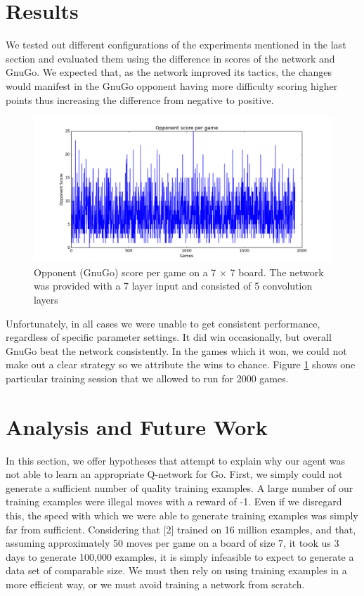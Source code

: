 \section{Results}

We tested out different configurations of the experiments mentioned in the last section and evaluated them using the difference in scores of the network and GnuGo. We expected that, as the network improved its tactics, the changes would manifest in the GnuGo opponent having more difficulty scoring higher points thus increasing the difference from negative to positive.

\begin{figure}[h!]
\centering
\includegraphics[scale=0.5]{training_score.png}
\caption{Opponent (GnuGo) score per game on a 7 $\times$ 7 board. The network was provided with a 7 layer input and consisted of 5 convolution layers}
\label{fig:score}
\end{figure}


Unfortunately, in all cases we were unable to get consistent performance, regardless of specific parameter settings. It did win occasionally, but overall GnuGo beat the network consistently. In the games which it won, we could not make out a clear strategy so we attribute the wins to chance. Figure \ref{fig:score} shows one particular training session that we allowed to run for 2000 games. 

\section{Analysis and Future Work}
In this section, we offer hypotheses that attempt to explain why our agent was not able to learn an appropriate Q-network for Go. First, we simply could not generate a sufficient number of quality training examples. A large number of our training examples were illegal moves with a reward of -1. Even if we disregard this, the speed with which we were able to generate training examples was simply far from sufficient. Considering that [2] trained on 16 million examples, and that, assuming approximately 50 moves per game on a board of size 7, it took us 3 days to generate 100,000 examples, it is simply infeasible to expect to generate a data set of comparable size. We must then rely on using training examples in a more efficient way, or we must avoid training a network from scratch.

